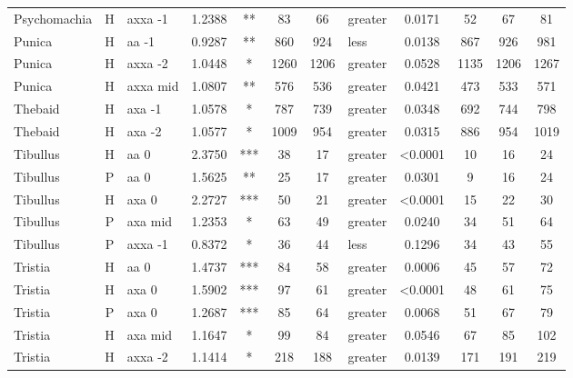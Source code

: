 \documentclass[twocolumn, switch]{article} %
\begin{document}
\begin{table}[h!]
\begin{adjustbox}{totalheight=0.9\textheight}
\begin{tabular}{lclcccclcc@{\hspace{1\tabcolsep}}c@{\hspace{1\tabcolsep}}c}
  Psychomachia &     H &   axxa -1 & 1.2388 &      ** &    83 &    66 &  greater &  0.0171 &       52 &       67 &       81 \\
        Punica &     H &     aa -1 & 0.9287 &      ** &   860 &   924 &     less &  0.0138 &      867 &      926 &      981 \\
        Punica &     H &   axxa -2 & 1.0448 &       * &  1260 &  1206 &  greater &  0.0528 &     1135 &     1206 &     1267 \\
        Punica &     H &  axxa mid & 1.0807 &      ** &   576 &   536 &  greater &  0.0421 &      473 &      533 &      571 \\
       Thebaid &     H &    axa -1 & 1.0578 &       * &   787 &   739 &  greater &  0.0348 &      692 &      744 &      798 \\
       Thebaid &     H &    axa -2 & 1.0577 &       * &  1009 &   954 &  greater &  0.0315 &      886 &      954 &     1019 \\
      Tibullus &     H &      aa 0 & 2.3750 &     *** &    38 &    17 &  greater &  <0.0001 &       10 &       16 &       24 \\
      Tibullus &     P &      aa 0 & 1.5625 &      ** &    25 &    17 &  greater &  0.0301 &        9 &       16 &       24 \\
      Tibullus &     H &     axa 0 & 2.2727 &     *** &    50 &    21 &  greater &  <0.0001 &       15 &       22 &       30 \\
      Tibullus &     P &   axa mid & 1.2353 &       * &    63 &    49 &  greater &  0.0240 &       34 &       51 &       64 \\
      Tibullus &     P &   axxa -1 & 0.8372 &       * &    36 &    44 &     less &  0.1296 &       34 &       43 &       55 \\
       Tristia &     H &      aa 0 & 1.4737 &     *** &    84 &    58 &  greater &  0.0006 &       45 &       57 &       72 \\
       Tristia &     H &     axa 0 & 1.5902 &     *** &    97 &    61 &  greater &  <0.0001 &       48 &       61 &       75 \\
       Tristia &     P &     axa 0 & 1.2687 &     *** &    85 &    64 &  greater &  0.0068 &       51 &       67 &       79 \\
       Tristia &     H &   axa mid & 1.1647 &       * &    99 &    84 &  greater &  0.0546 &       67 &       85 &      102 \\
       Tristia &     H &   axxa -2 & 1.1414 &       * &   218 &   188 &  greater &  0.0139 &      171 &      191 &      219 \\
  \bottomrule
  \end{tabular}
\end{adjustbox}
\end{table}
\end{document}
